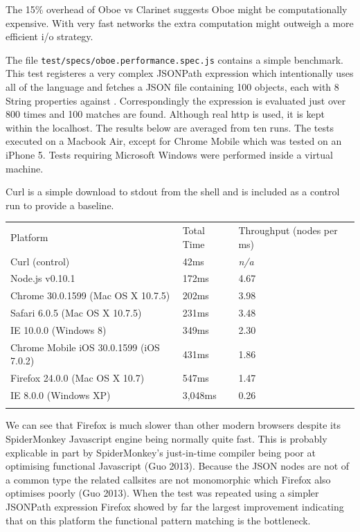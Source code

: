 \documentclass[]{article}
\begin{document}
The 15\% overhead of Oboe vs Clarinet suggests Oboe might be
computationally expensive. With very fast networks the extra computation
might outweigh a more efficient i/o strategy.

The file \texttt{test/specs/oboe.performance.spec.js} contains a simple
benchmark. This test registeres a very complex JSONPath expression which
intentionally uses all of the language and fetches a JSON file
containing 100 objects, each with 8 String properties against .
Correspondingly the expression is evaluated just over 800 times and 100
matches are found. Although real http is used, it is kept within the
localhost. The results below are averaged from ten runs. The tests
executed on a Macbook Air, except for Chrome Mobile which was tested on
an iPhone 5. Tests requiring Microsoft Windows were performed inside a
virtual machine.

Curl is a simple download to stdout from the shell and is included as a
control run to provide a baseline.

\begin{longtable}[c]{@{}lll@{}}
\hline\noalign{\medskip}
Platform & Total Time & Throughput (nodes per ms)
\\\noalign{\medskip}
\hline\noalign{\medskip}
Curl (control) & 42ms & \emph{n/a}
\\\noalign{\medskip}
Node.js v0.10.1 & 172ms & 4.67
\\\noalign{\medskip}
Chrome 30.0.1599 (Mac OS X 10.7.5) & 202ms & 3.98
\\\noalign{\medskip}
Safari 6.0.5 (Mac OS X 10.7.5) & 231ms & 3.48
\\\noalign{\medskip}
IE 10.0.0 (Windows 8) & 349ms & 2.30
\\\noalign{\medskip}
Chrome Mobile iOS 30.0.1599 (iOS 7.0.2) & 431ms & 1.86
\\\noalign{\medskip}
Firefox 24.0.0 (Mac OS X 10.7) & 547ms & 1.47
\\\noalign{\medskip}
IE 8.0.0 (Windows XP) & 3,048ms & 0.26
\\\noalign{\medskip}
\hline
\end{longtable}

We can see that Firefox is much slower than other modern browsers
despite its SpiderMonkey Javascript engine being normally quite fast.
This is probably explicable in part by SpiderMonkey's just-in-time
compiler being poor at optimising functional Javascript (Guo 2013).
Because the JSON nodes are not of a common type the related callsites
are not monomorphic which Firefox also optimises poorly (Guo 2013). When
the test was repeated using a simpler JSONPath expression Firefox showed
by far the largest improvement indicating that on this platform the
functional pattern matching is the bottleneck.
\end{document}
